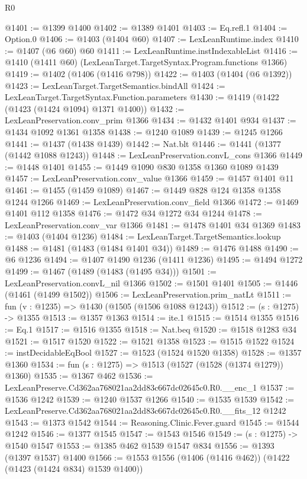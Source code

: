 \begin{lexlean}{R0}
\begin{coremodule}
@1401 := @1399 @1400
@1402 := @1389 @1401
@1403 := Eq.refl.{1}
@1404 := Option.{0}
@1406 := @1403 (@1404 @60)
@1407 := LexLeanRuntime.index
@1410 := @1407 (@6 @60) @60
@1411 := LexLeanRuntime.instIndexableList
@1416 := @1410 (@1411 @60) (LexLeanTarget.TargetSyntax.Program.functions @1366)
@1419 := @1402 (@1406 (@1416 @798))
@1422 := @1403 (@1404 (@6 @1392))
@1423 := LexLeanTarget.TargetSemantics.bindAll
@1424 := LexLeanTarget.TargetSyntax.Function.parameters
@1430 := @1419 (@1422 (@1423 (@1424 @1094) @1371 @1400))
@1432 := LexLeanPreservation.conv_prim @1366
@1434 := @1432 @1401 @934
@1437 := @1434 @1092 @1361 @1358
@1438 := @1240 @1089
@1439 := @1245 @1266
@1441 := @1437 (@1438 @1439)
@1442 := Nat.blt
@1446 := @1441 (@1377 (@1442 @1088 @1243))
@1448 := LexLeanPreservation.convL_cons @1366
@1449 := @1448 @1401
@1455 := @1449 @1090 @830 @1358 @1360 @1089 @1439
@1457 := LexLeanPreservation.conv_value @1366
@1459 := @1457 @1401 @11
@1461 := @1455 (@1459 @1089)
@1467 := @1449 @828 @124 @1358 @1358 @1244 @1266
@1469 := LexLeanPreservation.conv_field @1366
@1472 := @1469 @1401 @112 @1358
@1476 := @1472 @34 @1272 @34 @1244
@1478 := LexLeanPreservation.conv_var @1366
@1481 := @1478 @1401 @34 @1369
@1483 := @1403 (@1404 @1236)
@1484 := LexLeanTarget.TargetSemantics.lookup
@1488 := @1481 (@1483 (@1484 @1401 @34))
@1489 := @1476 @1488
@1490 := @6 @1236
@1494 := @1407 @1490 @1236 (@1411 @1236)
@1495 := @1494 @1272
@1499 := @1467 (@1489 (@1483 (@1495 @34)))
@1501 := LexLeanPreservation.convL_nil @1366
@1502 := @1501 @1401
@1505 := @1446 (@1461 (@1499 @1502))
@1506 := LexLeanPreservation.prim_natLt
@1511 := fun (v : @1235) => @1430 (@1505 (@1506 @1088 @1243))
@1512 := (s : @1275) -> @1355
@1513 := @1357 @1363
@1514 := ite.{1}
@1515 := @1514 @1355
@1516 := Eq.{1}
@1517 := @1516 @1355
@1518 := Nat.beq
@1520 := @1518 @1283 @34
@1521 := @1517 @1520
@1522 := @1521 @1358
@1523 := @1515 @1522
@1524 := instDecidableEqBool
@1527 := @1523 (@1524 @1520 @1358)
@1528 := @1357 @1360
@1534 := fun (s : @1275) => @1513 (@1527 (@1528 (@1374 @1279)) @1360)
@1535 := @1367 @462
@1536 := LexLeanPreserve.Cd362aa768021aa2dd83c667dc02645c0.R0.__enc_1
@1537 := @1536 @1242
@1539 := @1240 @1537 @1266
@1540 := @1535 @1539
@1542 := LexLeanPreserve.Cd362aa768021aa2dd83c667dc02645c0.R0.__fits_12 @1242
@1543 := @1373 @1542
@1544 := Reasoning.Clinic.Fever.guard
@1545 := @1544 @1242
@1546 := @1377 @1545
@1547 := @1543 @1546
@1549 := (s : @1275) -> @1540 @1547
@1553 := @1385 @462 @1539 @1547 @834
@1556 := @1393 (@1397 @1537) @1400
@1566 := @1553 @1556 (@1406 (@1416 @462)) (@1422 (@1423 (@1424 @834) @1539 @1400))

\end{coremodule}
\end{lexlean}
